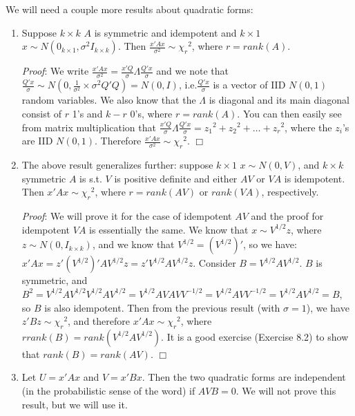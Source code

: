 \documentclass[12pt,oneside]{article}
\begin{document}
We will need a couple more results about quadratic forms:
\begin{enumerate}
\item Suppose $k \times k$ $A$ is symmetric and idempotent and $k \times 1$ $x \sim N(0_{k\times 1}, \sigma^2 I_{k \times k})$. Then $\frac{x'Ax}{\sigma^2} \sim {\chi_r}^2$, where $r = rank(A)$.

\emph{Proof}: We write $\frac{x'Ax}{\sigma^2} = \frac{x'Q}{\sigma} \Lambda \frac{Q'x}{\sigma}$ and we note that $\frac{Q'x}{\sigma} \sim N(0, \frac{1}{\sigma^2} \times \sigma^2 Q'Q) = N(0, I)$, i.e.$\frac{Q'x}{\sigma}$ is a vector of IID $N(0,1)$ random variables. We also know that the $\Lambda$ is diagonal and its main diagonal consist of $r$ 1's and $k-r$ 0's, where $r = rank(A)$. You can then easily see from matrix multiplication that $\frac{x'Q}{\sigma} \Lambda \frac{Q'x}{\sigma} = {z_1}^2 + {z_2}^2 + \ldots + {z_r}^2$, where the $z_i$'s are IID $N(0,1)$. Therefore $\frac{x'Ax}{\sigma^2} \sim {\chi_r}^2$. $\Box$

\item The above result generalizes further: suppose $k \times1$ $x
  \sim N(0, V)$, and $k \times k$ symmetric $A$ is s.t. $V$ is positive definite and either $AV$ or $VA$ is idempotent. Then $x'Ax \sim {\chi_r}^2$, where $r = rank(AV)$ or $rank(VA)$, respectively.

\emph{Proof}: We will prove it for the case of idempotent $AV$ and the proof for idempotent $VA$ is essentially the same. We know that $x \sim V^{1/2}z$, where $z \sim N(0, I_{k \times k})$, and we know that $V^{1/2} = (V^{1/2})'$, so we have: $x'Ax = z'(V^{1/2})' A V^{1/2} z = z' V^{1/2} A V^{1/2} z$. Consider $B = V^{1/2} A V^{1/2}$. $B$ is symmetric, and $B^2 = V^{1/2} A V^{1/2} V^{1/2} A V^{1/2} = V^{1/2} A V A V V^{-1/2} = V^{1/2} A V V^{-1/2} = V^{1/2} A V^{1/2} = B$, so $B$ is also idempotent. Then from the previous result (with $\sigma = 1$), we have $z'Bz \sim {\chi_r}^2$, and therefore $x'Ax \sim {\chi_r}^2$, where $r  rank(B) = rank (V^{1/2} A V^{1/2})$. It is a good exercise (Exercise 8.2) to show that $rank(B) = rank (AV)$. $\Box$

\item Let $U = x'Ax$ and $V = x'Bx$. Then the two quadratic forms are
  independent (in the probabilistic sense of the word) if $AVB =
  0$. We will not prove this result, but we will use it.
\end{enumerate}
\end{document}
